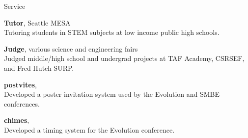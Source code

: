 \documentclass[12pt]{tracv}
\begin{document}
    \begin{hangingsection}{Service}

        \hangingentry \textbf{Tutor}, Seattle MESA \\
        Tutoring students in STEM subjects at low income public high schools.

        \hangingentry \textbf{Judge}, various science and engineering fairs \\
        Judged middle/high school and undergrad projects at TAF Academy, CSRSEF, and Fred Hutch SURP.

        \hangingentry \textbf{postvites},  \\
        Developed a poster invitation system used by the Evolution and SMBE conferences.

        \hangingentry \textbf{chimes},  \\
        Developed a timing system for the Evolution conference.

    \end{hangingsection}
\end{document}
